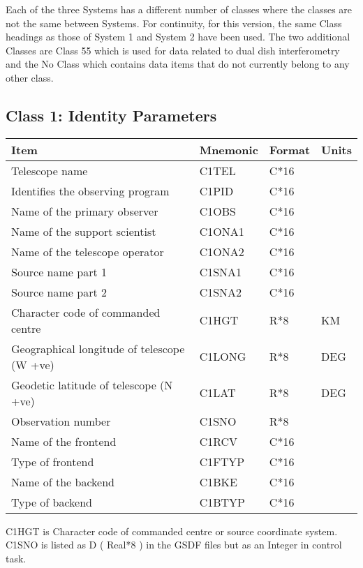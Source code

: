   Each of the three Systems has a different number of classes where
the classes are not the same between Systems. For continuity, for this
version, the same Class headings as those of System 1 and System 2 have
been used. The two additional Classes are Class 55 which is used for
data related to dual dish interferometry and the No Class which 
contains data items that do not currently belong to any other class.


\small
\subsection{Class 1: Identity Parameters}


\begin{tabular}{||l|l|l|l||} \hline
Item                      & Mnemonic & Format & Units \\ \hline
Telescope name            & C1TEL    & C*16   &       \\      
Identifies the observing program & C1PID    & C*16   & ~     \\
Name of the primary observer     & C1OBS    & C*16   & ~     \\
Name of the support scientist    & C1ONA1   & C*16   & ~     \\
Name of the telescope operator   & C1ONA2   & C*16   & ~     \\
Source name part 1               & C1SNA1   & C*16   & ~     \\
Source name part 2               & C1SNA2   & C*16   & ~     \\
Character code of commanded centre  & C1HGT    & R*8    & KM    \\
Geographical longitude of telescope (W +ve) & C1LONG   & R*8    & DEG   \\
Geodetic latitude of telescope (N +ve)      & C1LAT    & R*8    & DEG   \\
Observation number        & C1SNO    & R*8    &  ~    \\
Name of the frontend      & C1RCV    & C*16   &  ~    \\
Type of frontend          & C1FTYP   & C*16   &  ~    \\
Name of the backend       & C1BKE    & C*16   &  ~    \\
Type of backend           & C1BTYP   & C*16   &  ~    \\ \hline
\end{tabular}


 C1HGT is Character code of commanded centre or source coordinate system. \\
 C1SNO is listed as D ( Real*8 ) in the GSDF files but as an Integer in control task.





